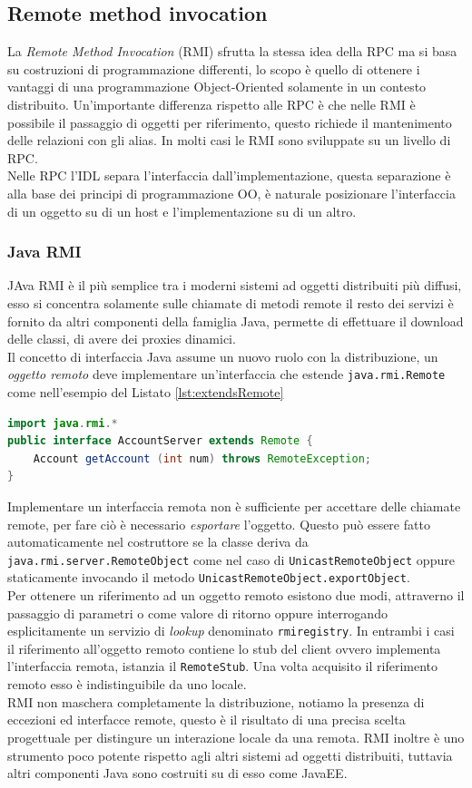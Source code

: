 \subsection{Remote method invocation}
La \emph{Remote Method Invocation} (RMI) sfrutta la stessa idea della RPC ma si basa su costruzioni di programmazione differenti, lo scopo è quello di ottenere i vantaggi di una programmazione Object-Oriented solamente in un contesto distribuito. Un'importante differenza rispetto alle RPC è che nelle RMI è possibile il passaggio di oggetti per riferimento, questo richiede il mantenimento delle relazioni con gli alias. In molti casi le RMI sono sviluppate su un livello di RPC.\\
Nelle RPC l'IDL separa l'interfaccia dall'implementazione, questa separazione è alla base dei principi di programmazione OO, è naturale posizionare l'interfaccia di un oggetto su di un host e l'implementazione su di un altro.\\
\subsubsection{Java RMI}
JAva RMI è il più semplice tra i moderni sistemi ad oggetti distribuiti più diffusi, esso si concentra solamente sulle chiamate di metodi remote il resto dei servizi è fornito da altri componenti della famiglia Java, permette di effettuare il download delle classi, di avere dei proxies dinamici.\\
Il concetto di interfaccia Java assume un nuovo ruolo con la distribuzione, un \emph{oggetto remoto} deve implementare un'interfaccia che estende \texttt{java.rmi.Remote} come nell'esempio del Listato \ref{lst:extendsRemote}
\begin{lstlisting}[language=Java,caption="Esempio di interfaccia remota",label=lst:extendsRemote]
import java.rmi.*
public interface AccountServer extends Remote {
	Account getAccount (int num) throws RemoteException;
}
\end{lstlisting}
Implementare un interfaccia remota non è sufficiente per accettare delle chiamate remote, per fare ciò è necessario \emph{esportare} l'oggetto.
Questo può essere fatto automaticamente nel costruttore se la classe deriva da \texttt{java.rmi.server.RemoteObject} come nel caso di \texttt{UnicastRemoteObject} oppure staticamente invocando il metodo \texttt{UnicastRemoteObject.exportObject}.\\
Per ottenere un riferimento ad un oggetto remoto esistono due modi, attraverno il passaggio di parametri o come valore di ritorno oppure interrogando esplicitamente un servizio di \emph{lookup} denominato \texttt{rmiregistry}. In entrambi i casi il riferimento all'oggetto remoto contiene lo stub del client ovvero implementa l'interfaccia remota, istanzia il \texttt{RemoteStub}. Una volta acquisito il riferimento remoto esso è indistinguibile da uno locale.\\
RMI non maschera completamente la distribuzione, notiamo la presenza di eccezioni ed interfacce remote, questo è il risultato di una precisa scelta progettuale per distingure un interazione locale da una remota. RMI inoltre è uno strumento poco potente rispetto agli altri sistemi ad oggetti distribuiti, tuttavia altri componenti Java sono costruiti su di esso come JavaEE.